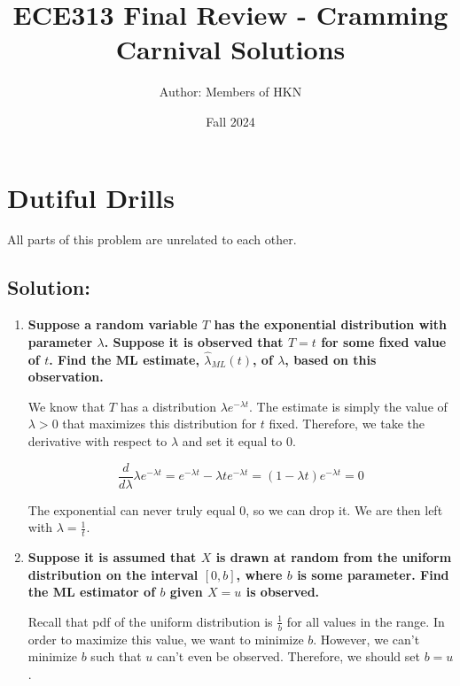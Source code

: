\documentclass{article}
\title{ECE313 Final Review - Cramming Carnival Solutions}
\author{Author: Members of HKN}
\date{Fall 2024}
\begin{document}
\maketitle


\section{Dutiful Drills}

All parts of this problem are unrelated to each other.

\subsection{Solution:}

\begin{enumerate}[label=(\alph*)]
\itemsep0em
    \item \textbf{Suppose a random variable $T$ has the exponential distribution with parameter $\lambda$. Suppose it is observed that $T = t$ for some fixed value of $t$. Find the ML estimate, $\hat{\lambda}_{ML}(t)$, of $\lambda$, based on this observation.}

    We know that $T$ has a distribution $\lambda e^{-\lambda t}$. The estimate is simply the value of $\lambda > 0$ that maximizes this distribution for $t$ fixed. Therefore, we take the derivative with respect to $\lambda$ and set it equal to $0$.

    $$\frac{d}{d\lambda} \lambda e^{-\lambda t} = e^{-\lambda t} - \lambda te^{-\lambda t} = (1 - \lambda t)e^{-\lambda t} = 0$$

    The exponential can never truly equal $0$, so we can drop it. We are then left with $\boxed{\lambda = \frac{1}{t}}$.

    \vspace{3cm}
    
    \item \textbf{Suppose it is assumed that $X$ is drawn at random from the uniform distribution on the interval $[0, b]$, where $b$ is some parameter. Find the ML estimator of $b$ given $X = u$ is observed.}

    Recall that pdf of the uniform distribution is $\frac{1}{b}$ for all values in the range. In order to maximize this value, we want to minimize $b$. However, we can't minimize $b$ such that $u$ can't even be observed. Therefore, we should set $\boxed{b = u}$.

    \vspace{3cm}
    

\end{enumerate}
\end{document}
